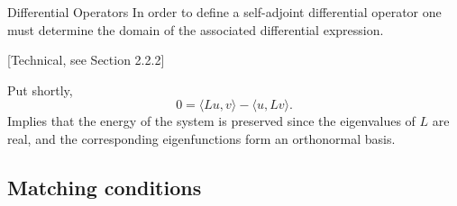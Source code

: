 \documentclass{beamer}
\newcommand{\Dop}[1]{\frac{d}{d#1}}
\begin{document}
  \begin{frame}{Differential Operators}
    In order to define a self-adjoint differential operator one must determine the domain of the associated differential expression.

    [Technical, see Section 2.2.2]\vspace{\baselineskip}

    Put shortly,
    \[
      0 = \langle Lu, v \rangle - \langle u, Lv \rangle.
    \]
    Implies that the energy of the system is preserved since the eigenvalues of $L$ are real, and the corresponding eigenfunctions form an orthonormal basis.
  \end{frame}


  \subsection{Matching conditions}

\end{document}

